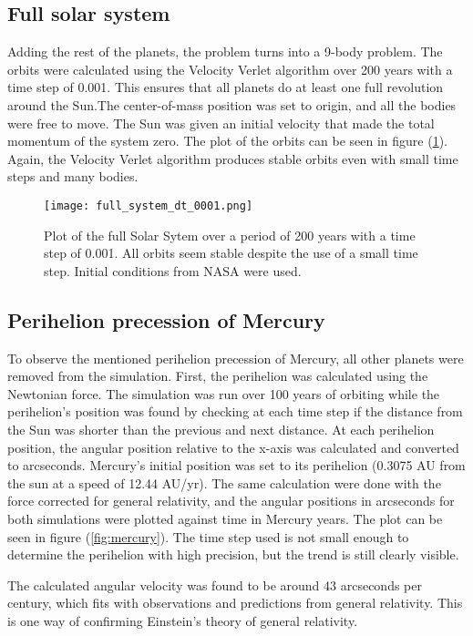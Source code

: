 \documentclass[10pt,a4paper,titlepage]{article}
\begin{document}
\subsection{Full solar system}
Adding the rest of the planets, the problem turns into a 9-body problem. The orbits were calculated using the Velocity Verlet algorithm over 200 years with a time step of 0.001. This ensures that all planets do at least one full revolution around the Sun.The center-of-mass position was set to origin, and all the bodies were free to move. The Sun was given an initial velocity that made the total momentum of the system zero. The plot of the orbits can be seen in figure (\ref{fig:full_system}). Again, the Velocity Verlet algorithm produces stable orbits even with small time steps and many bodies. 

\begin{figure}[]
\centering
\centering\texttt{[image: full\_system\_dt\_0001.png]}
\caption{Plot of the full Solar Sytem over a period of 200 years with a time step of 0.001. All orbits seem stable despite the use of a small time step. Initial conditions from NASA were used. \label{fig:full_system}}
\end{figure}

\subsection{Perihelion precession of Mercury}
To observe the mentioned perihelion precession of Mercury, all other planets were removed from the simulation. First, the perihelion was calculated using the Newtonian force. The simulation was run over 100 years of orbiting while the perihelion's position was found by checking at each time step if the distance from the Sun was shorter than the previous and next distance. At each perihelion position, the angular position relative to the x-axis was calculated and converted to arcseconds. Mercury's initial position was set to its perihelion (0.3075 AU from the sun at a speed of 12.44 AU/yr). The same calculation were done with the force corrected for general relativity, and the angular positions in arcseconds for both simulations were plotted against time in Mercury years. The plot can be seen in figure (\ref{fig:mercury}). The time step used is not small enough to determine the perihelion with high precision, but the trend is still clearly visible.

The calculated angular velocity was found to be around 43 arcseconds per century, which fits with observations and predictions from general relativity. This is one way of confirming Einstein's theory of general relativity.
\end{document}
